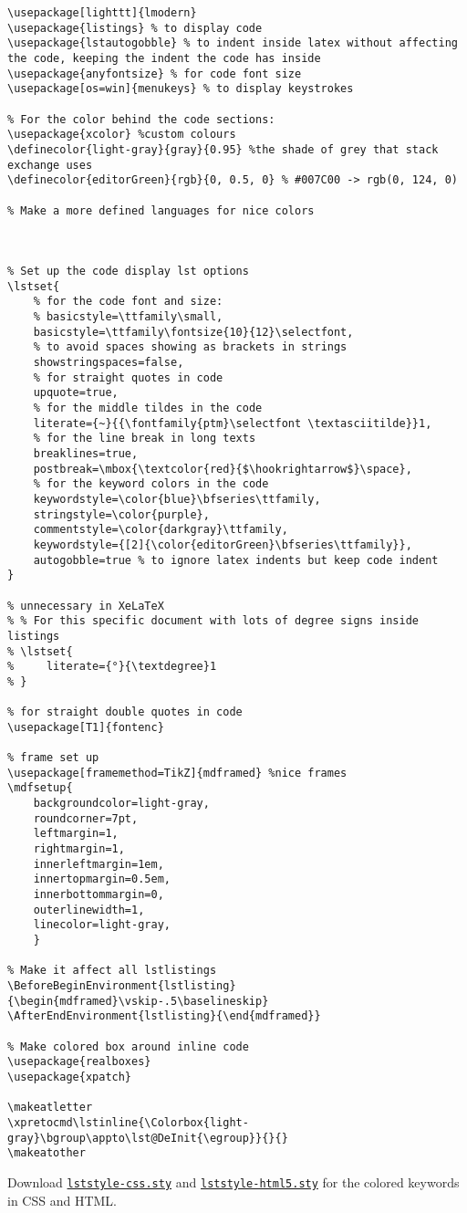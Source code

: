 \begin{lstlisting}[language={[latex]TeX}, title={small Language: XeLaTeX}]
\usepackage[lighttt]{lmodern}
\usepackage{listings} % to display code
\usepackage{lstautogobble} % to indent inside latex without affecting the code, keeping the indent the code has inside
\usepackage{anyfontsize} % for code font size
\usepackage[os=win]{menukeys} % to display keystrokes

% For the color behind the code sections:
\usepackage{xcolor} %custom colours
\definecolor{light-gray}{gray}{0.95} %the shade of grey that stack exchange uses
\definecolor{editorGreen}{rgb}{0, 0.5, 0} % #007C00 -> rgb(0, 124, 0)

% Make a more defined languages for nice colors



% Set up the code display lst options
\lstset{
    % for the code font and size:
    % basicstyle=\ttfamily\small,
    basicstyle=\ttfamily\fontsize{10}{12}\selectfont,
    % to avoid spaces showing as brackets in strings
    showstringspaces=false,
    % for straight quotes in code
    upquote=true, 
    % for the middle tildes in the code
    literate={~}{{\fontfamily{ptm}\selectfont \textasciitilde}}1,
    % for the line break in long texts
    breaklines=true,
    postbreak=\mbox{\textcolor{red}{$\hookrightarrow$}\space}, 
    % for the keyword colors in the code
    keywordstyle=\color{blue}\bfseries\ttfamily,
    stringstyle=\color{purple},
    commentstyle=\color{darkgray}\ttfamily,
    keywordstyle={[2]{\color{editorGreen}\bfseries\ttfamily}},
    autogobble=true % to ignore latex indents but keep code indent
}

% unnecessary in XeLaTeX
% % For this specific document with lots of degree signs inside listings
% \lstset{
%     literate={°}{\textdegree}1
% }

% for straight double quotes in code
\usepackage[T1]{fontenc}

% frame set up
\usepackage[framemethod=TikZ]{mdframed} %nice frames
\mdfsetup{
    backgroundcolor=light-gray,
    roundcorner=7pt,
    leftmargin=1,
    rightmargin=1,
    innerleftmargin=1em,
    innertopmargin=0.5em,
    innerbottommargin=0,
    outerlinewidth=1,
    linecolor=light-gray,
    } 

% Make it affect all lstlistings
\BeforeBeginEnvironment{lstlisting}{\begin{mdframed}\vskip-.5\baselineskip}
\AfterEndEnvironment{lstlisting}{\end{mdframed}}

% Make colored box around inline code
\usepackage{realboxes}
\usepackage{xpatch}

\makeatletter
\xpretocmd\lstinline{\Colorbox{light-gray}\bgroup\appto\lst@DeInit{\egroup}}{}{}
\makeatother
\end{lstlisting}

Download \href{}{\lstinline{lststyle-css.sty}} and \href{}{\lstinline{lststyle-html5.sty}} for the colored keywords in CSS and HTML.


